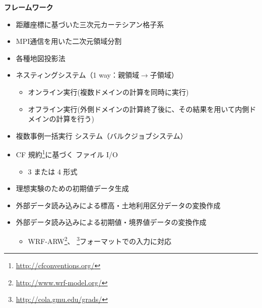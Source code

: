 {\bf フレームワーク}
\begin{itemize}
 \item 距離座標に基づいた三次元カーテシアン格子系
 \item MPI通信を用いた二次元領域分割
 \item 各種地図投影法
 \item ネスティングシステム（1 way：親領域$\to$子領域）
   \begin{itemize}
    \item オンライン実行(複数ドメインの計算を同時に実行)
    \item オフライン実行(外側ドメインの計算終了後に、その結果を用いて内側ドメインの計算を行う)
   \end{itemize}
 \item 複数事例一括実行 システム（バルクジョブシステム）
 \item CF 規約\footnote{\url{http://cfconventions.org/}}に基づく \netcdf ファイル I/O
   \begin{itemize}
   \item {\netcdf}3 または {\netcdf}4 形式
   \end{itemize}
 \item 理想実験のための初期値データ生成
 \item 外部データ読み込みによる標高・土地利用区分データの変換作成
 \item 外部データ読み込みによる初期値・境界値データの変換作成
   \begin{itemize}
    \item 
      WRF-ARW\footnote{\url{http://www.wrf-model.org/}}、
      \grads \footnote{\url{http://cola.gmu.edu/grads/}}フォーマットでの入力に対応
   \end{itemize}
\end{itemize}

